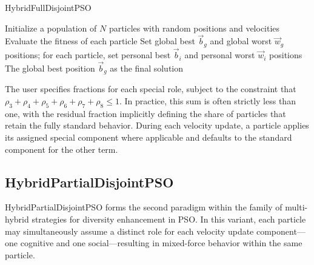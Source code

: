 {%
\vspace{.935em}
\begin{algorithm}[H]
\caption{HybridFullDisjointPSO}\label{alg:hybridfulldisjoint}
Initialize a population of \(N\) particles with random positions and velocities\;  
Evaluate the fitness of each particle\;  
Set global best \(\vec{b}_g\) and global worst \(\vec{w}_g\) positions; for each particle, set personal best \(\vec{b}_i\) and personal worst \(\vec{w}_i\) positions\;  
\Return The global best position \(\vec{b}_g\) as the final solution \;
\end{algorithm}



The user specifies fractions for each special role, subject to the constraint that \(\rho_3 + \rho_4 + \rho_5 + \rho_6 + \rho_7 + \rho_8 \leq 1\). In practice, this sum is often strictly less than one, with the residual fraction implicitly defining the share of particles that retain the fully standard behavior. During each velocity update, a particle applies its assigned special component where applicable and defaults to the standard component for the other term.


\subsection{HybridPartialDisjointPSO}


HybridPartialDisjointPSO forms the second paradigm within the family of multi-hybrid strategies for diversity enhancement in PSO. In this variant, each particle may simultaneously assume a distinct role for each velocity update component---one cognitive and one social---resulting in mixed-force behavior within the same particle.

}
